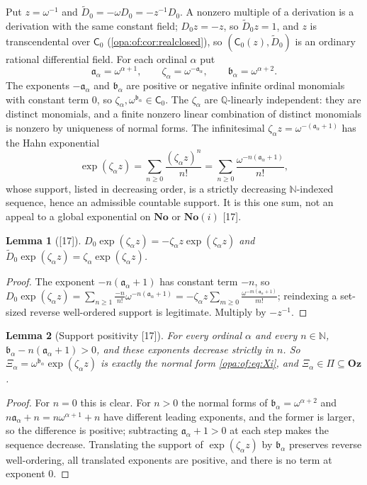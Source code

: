\documentclass[11pt,oneside]{article}
\numberwithin{equation}{section}
\newtheorem{lemma}[lemma]{Lemma}
\theoremstyle{definition}
\theoremstyle{remark}
\newcommand{\No}{\mathbf{No}}
\newcommand{\Oz}{\mathbf{Oz}}
\newcommand{\SC}{\mathbf{No}(i)}
\newcommand{\Q}{\mathbb Q}
\newcommand{\N}{\mathbb N}
\newcommand{\src}[1]{\textup{\textsf{\small[#1]}}}
\begin{document}
Put $z=\omega^{-1}$ and $\widetilde D_0=-\omega D_0=-z^{-1}D_0$. A nonzero multiple of a derivation is a derivation with the
same constant field; $D_0z=-z$, so $\widetilde D_0z=1$, and $z$ is transcendental over $\mathsf C_0$
(\cref{opa:of:cor:realclosed}), so $(\mathsf C_0(z),\widetilde D_0)$ is an ordinary rational differential field. For each ordinal
$\alpha$ put
\begin{equation}\label{opa:of:eq:witnessdata}
 \mathfrak a_\alpha=\omega^{\alpha+1},\qquad \zeta_\alpha=\omega^{-\mathfrak a_\alpha},\qquad \mathfrak b_\alpha=\omega^{\alpha+2}.
\end{equation}
The exponents $-\mathfrak a_\alpha$ and $\mathfrak b_\alpha$ are positive or negative infinite ordinal monomials with constant term
$0$, so $\zeta_\alpha,\omega^{\mathfrak b_\alpha}\in\mathsf C_0$. The $\zeta_\alpha$ are $\Q$-linearly independent: they are distinct
monomials, and a finite nonzero linear combination of distinct monomials is nonzero by uniqueness of normal forms. The
infinitesimal $\zeta_\alpha z=\omega^{-(\mathfrak a_\alpha+1)}$ has the Hahn exponential
\[
 \exp(\zeta_\alpha z)=\sum_{n\ge0}\frac{(\zeta_\alpha z)^n}{n!}=\sum_{n\ge0}\frac{\omega^{-n(\mathfrak a_\alpha+1)}}{n!},
\]
whose support, listed in decreasing order, is a strictly decreasing $\N$-indexed sequence, hence an admissible countable
support. It is this one sum, not an appeal to a global exponential on $\No$ or $\SC$ \src{17}.

\begin{lemma}[\src{17}]\label{opa:of:lem:Ederivative}
$D_0\exp(\zeta_\alpha z)=-\zeta_\alpha z\exp(\zeta_\alpha z)$ and $\widetilde D_0\exp(\zeta_\alpha z)=\zeta_\alpha\exp(\zeta_\alpha z)$.
\end{lemma}
\begin{proof}
The exponent $-n(\mathfrak a_\alpha+1)$ has constant term $-n$, so
$D_0\exp(\zeta_\alpha z)=\sum_{n\ge1}\frac{-n}{n!}\omega^{-n(\mathfrak a_\alpha+1)}=-\zeta_\alpha z\sum_{m\ge0}\frac{\omega^{-m(\mathfrak a_\alpha+1)}}{m!}$;
reindexing a set-sized reverse well-ordered support is legitimate. Multiply by $-z^{-1}$.
\end{proof}

\begin{lemma}[Support positivity \src{17}]\label{opa:of:lem:positivity}
For every ordinal $\alpha$ and every $n\in\N$, $\mathfrak b_\alpha-n(\mathfrak a_\alpha+1)>0$, and these exponents decrease strictly in
$n$. So $\Xi_\alpha=\omega^{\mathfrak b_\alpha}\exp(\zeta_\alpha z)$ is exactly the normal form \eqref{opa:of:eq:Xi}, and
$\Xi_\alpha\in\Pi\subseteq\Oz$.
\end{lemma}
\begin{proof}
For $n=0$ this is clear. For $n>0$ the normal forms of $\mathfrak b_\alpha=\omega^{\alpha+2}$ and $n\mathfrak a_\alpha+n=n\omega^{\alpha+1}+n$
have different leading exponents, and the former is larger, so the difference is positive; subtracting $\mathfrak a_\alpha+1>0$ at
each step makes the sequence decrease. Translating the support of $\exp(\zeta_\alpha z)$ by $\mathfrak b_\alpha$ preserves reverse
well-ordering, all translated exponents are positive, and there is no term at exponent $0$.
\end{proof}
\end{document}

